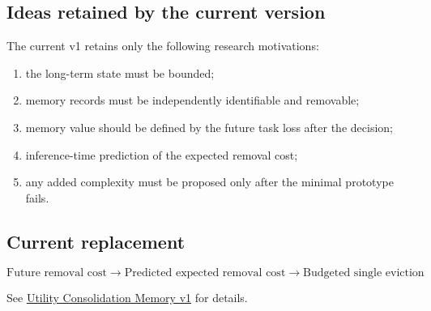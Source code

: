 \subsection{Ideas retained by the current version}

The current v1 retains only the following research motivations:

\begin{enumerate}
  \item the long-term state must be bounded;
  \item memory records must be independently identifiable and removable;
  \item memory value should be defined by the future task loss after the decision;
  \item inference-time prediction of the expected removal cost;
  \item any added complexity must be proposed only after the minimal prototype fails.
\end{enumerate}

\subsection{Current replacement}

\[
\boxed{
\text{Future removal cost}
\longrightarrow
\text{Predicted expected removal cost}
\longrightarrow
\text{Budgeted single eviction}
}
\]

See \href{utility-consolidation-memory-v1.md}{Utility Consolidation Memory v1} for details.
